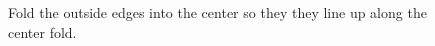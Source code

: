 \documentclass[12pt]{article}
\begin{document}
\begin{figure}[!t]
  \centering
  \caption{Fold the outside edges into the center so they they line up along the center fold.}
  \qquad
\end{figure}
\end{document}
